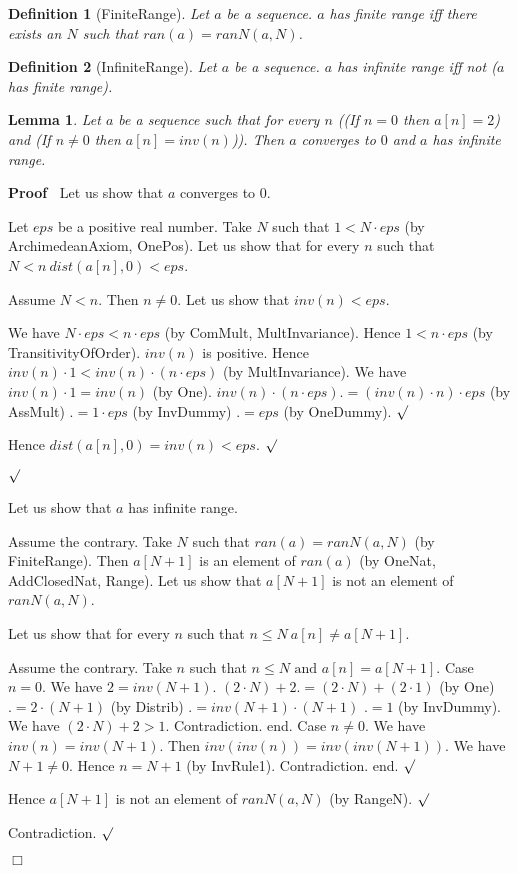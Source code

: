 \documentclass{article}
\newenvironment{forthel}{\begin{leftbar}}{\end{leftbar}}
\newenvironment{proof}{\noindent\textbf{Proof\ }}{\hspace*{\fill}$\Box$\medskip}
\newenvironment{subproof}{\begin{list}{}{}
		\item[\text{Proof}]}{\hfill $\surd$ \end{list}}
\newtheorem{lemma}{Lemma}
\newtheorem{definition}{Definition}
\begin{document}
\begin{forthel}
	\begin{definition} [FiniteRange]	Let $a$ be a sequence. $a$ has finite range iff there exists an $N$ such that $ran(a) = ranN(a,N)$.
	\end{definition}

	\begin{definition} [InfiniteRange] Let $a$ be a sequence. $a$ has infinite range iff not ($a$ has finite range).
	\end{definition}
	
	\begin{lemma} Let $a$ be a sequence such that for every $n$
	((If $n = 0$ then $a[n] = 2$) and (If $n \neq 0$ then $a[n] = inv(n)$)).
	Then $a$ converges to $0$ and $a$ has infinite range.
	\end{lemma}
	\begin{proof} Let us show that $a$ converges to $0$.
	\begin{subproof}
	Let $eps$ be a positive real number. 
	Take $N$ such that $1 < N \cdot eps$ (by ArchimedeanAxiom, OnePos).
	Let us show that for every $n$ such that $N < n \ dist(a[n],0) < eps$.
	\begin{subproof}
	Assume $N < n$. Then $n \neq 0$.
	Let us show that $inv(n) < eps$.
	\begin{subproof}
	We have $N \cdot eps < n \cdot eps$ (by ComMult, MultInvariance).
	Hence $1 < n \cdot eps$ (by TransitivityOfOrder).
	$inv(n)$ is positive.
	Hence $inv(n) \cdot 1 < inv(n) \cdot (n \cdot eps)$ (by MultInvariance).
	We have $inv(n) \cdot 1 = inv(n)$ (by One).
	$inv(n) \cdot (n \cdot eps) .= (inv(n) \cdot n) \cdot eps$ (by AssMult)
	$.= 1 \cdot eps$ (by InvDummy)
	$.= eps$ (by OneDummy).
	\end{subproof}
	Hence $dist(a[n],0) = inv(n) < eps$.
	\end{subproof}
	\end{subproof}
	Let us show that $a$ has infinite range.
	\begin{subproof}
	Assume the contrary.
	Take $N$ such that $ran(a) = ranN(a,N)$ (by FiniteRange).
	Then $a[N + 1]$ is an element of $ran(a)$ (by OneNat, AddClosedNat, Range).
	Let us show that $a[N + 1]$ is not an element of $ranN(a,N)$.
	\begin{subproof}
	Let us show that for every $n$ such that $n \leq N \ a[n] \neq a[N + 1]$.
	\begin{subproof}
	Assume the contrary.
	Take $n$ such that $n \leq N \text{ and } a[n] = a[N + 1]$.
	Case $n = 0$.
	We have $2 = inv(N + 1)$.
	$(2 \cdot N) + 2 .= (2 \cdot N) + (2 \cdot 1)$ (by One)
	$.= 2 \cdot (N + 1)$ (by Distrib)
	$.= inv(N + 1) \cdot (N + 1)$
	$.= 1$ (by InvDummy).
	We have $(2 \cdot N) + 2 > 1$.
	Contradiction.
	end.
	Case $n \neq 0$.
	We have $inv(n) = inv(N + 1)$.
	Then $inv(inv(n)) = inv(inv(N + 1))$.
	We have $N + 1 \neq 0$.
	Hence $n = N + 1$ (by InvRule1).
	Contradiction.
	end.
	\end{subproof}
	Hence $a[N + 1]$ is not an element of $ranN(a,N)$ (by RangeN).
	\end{subproof}
	Contradiction.
	\end{subproof}
	\end{proof}
	

\end{forthel}
\end{document}
